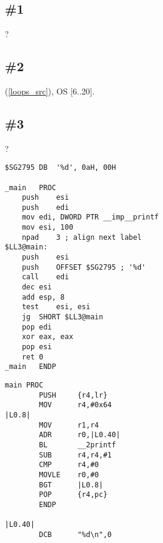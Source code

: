 \section{\Exercises}

\subsection{\Exercise \#1}

 \LOOP {}?

\subsection{\Exercise \#2}

(\ref{loops_src}), 
 \ac{OS}
 [6..20].

\subsection{\Exercise \#3}
\label{exercise_loops_3}

?

\begin{lstlisting}[caption=MSVC 2010 /Ox]
$SG2795	DB	'%d', 0aH, 00H

_main	PROC
	push	esi
	push	edi
	mov	edi, DWORD PTR __imp__printf
	mov	esi, 100
	npad	3 ; align next label
$LL3@main:
	push	esi
	push	OFFSET $SG2795 ; '%d'
	call	edi
	dec	esi
	add	esp, 8
	test	esi, esi
	jg	SHORT $LL3@main
	pop	edi
	xor	eax, eax
	pop	esi
	ret	0
_main	ENDP
\end{lstlisting}

\begin{lstlisting}[caption=Keil 5.03 (\ARMMode)]
main PROC
        PUSH     {r4,lr}
        MOV      r4,#0x64
|L0.8|
        MOV      r1,r4
        ADR      r0,|L0.40|
        BL       __2printf
        SUB      r4,r4,#1
        CMP      r4,#0
        MOVLE    r0,#0
        BGT      |L0.8|
        POP      {r4,pc}
        ENDP

|L0.40|
        DCB      "%d\n",0
\end{lstlisting}

